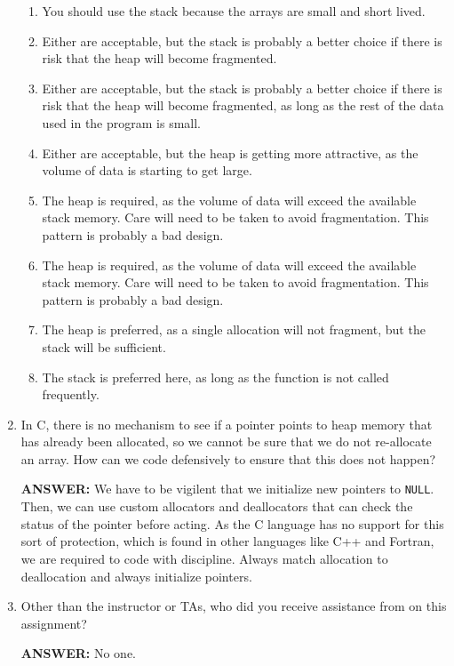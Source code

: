 \begin{enumerate}
    \begin{enumerate}
        \item You should use the stack because the arrays are small and short lived.
        \item Either are acceptable, but the stack is probably a better choice if there is risk that the heap will become fragmented.  
        \item Either are acceptable, but the stack is probably a better choice if there is risk that the heap will become fragmented, as long as the rest of the data used in the program is small.
        \item Either are acceptable, but the heap is getting more attractive, as the volume of data is starting to get large.
        \item The heap is required, as the volume of data will exceed the available stack memory.  Care will need to be taken to avoid fragmentation.  This pattern is probably a bad design.
        \item The heap is required, as the volume of data will exceed the available stack memory.  Care will need to be taken to avoid fragmentation.  This pattern is probably a bad design.
        \item The heap is preferred, as a single allocation will not fragment, but the stack will be sufficient.
        \item The stack is preferred here, as long as the function is not called frequently.
    \end{enumerate}    

    \item In C, there is no mechanism to see if a pointer points to heap memory that has already been allocated, so we cannot be sure that we do not re-allocate an array.  How can we code defensively to ensure that this does not happen?

    \textbf{ANSWER:} We have to be vigilent that we initialize new pointers to \texttt{NULL}.  Then, we can use custom allocators and deallocators that can check the status of the pointer before acting.  As the C language has no support for this sort of protection, which is found in other languages like C++ and Fortran, we are required to code with discipline.  Always match allocation to deallocation and always initialize pointers.
    

    \item Other than the instructor or TAs, who did you receive assistance from on this assignment?
    
    \textbf{ANSWER:} No one.
    
\end{enumerate}
